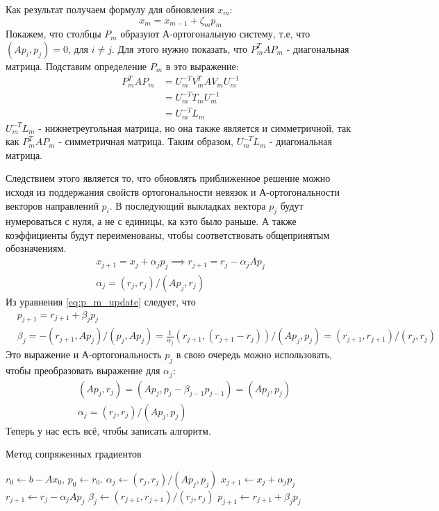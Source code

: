 Как результат получаем формулу для обновления $x_m$:
\begin{equation*}
    x_m = x_{m-1} + \zeta_m p_m
\end{equation*}
Покажем, что столбцы $P_m$ образуют А-ортогональную систему, т.е, что $(Ap_i,p_j) = 0$, для $i \neq j$.
Для этого нужно показать, что $P_m^T AP_m$ - диагональная матрица. Подставим определение $P_m$ в это выражение:
\begin{align}
    P_m^T AP_m &= U_m^{-T}V_m^T AV_m U_m^{-1} \\
               &= U_m^{-T}T_m U_m^{-1} \\
               &=U_m^{-T}L_m
\end{align}
$U_m^{-T}L_m$ - нижнетреугольная матрица, но она также является и симметричной, 
так как $P_m^T AP_m$ - симметричная матрица. Таким образом, $U_m^{-T}L_m$ - диагональная матрица.
\par Следствием этого является то, что обновлять приближенное решение можно исходя из
поддержания свойств ортогональности невязок и А-ортогональности векторов направлений $p_i$.
В последующий выкладках вектора $p_j$ будут нумероваться с нуля, а не с единицы, ка кэто было раньше.
А также коэффициенты будут переименованы, чтобы соответствовать общепринятым обозначениям.
\begin{align*}
    x_{j+1} = x_j + \alpha_j p_j \implies r_{j+1} = r_j - \alpha_j A p_j \\
    \alpha_j = \left( r_j, r_j \right) / \left( Ap_j, r_j \right)
\end{align*}
Из уравнения \eqref{eq:p_m_update} следует, что 
\begin{align*}
    &p_{j+1} = r_{j+1} + \beta_j p_j  \\
    &\beta_j = - (r_{j+1}, Ap_j) / (p_j, Ap_j) = \frac{1}{\alpha_j} (r_{j+1}, (r_{j+1}-r_j)) / (Ap_j,p_j) = (r_{j+1}, r_{j+1}) / (r_j,r_j)
\end{align*}
Это выражение и А-ортогональность $p_j$ в свою очередь можно использовать, чтобы преобразовать выражение для $\alpha_j$:
\begin{align*}
    &(Ap_j,r_j) = (Ap_j,p_j-\beta_{j-1}p_{j-1}) = (Ap_j,p_j) \\
    &\alpha_j = (r_j,r_j)/(Ap_j, p_j)
\end{align*}
Теперь у нас есть всё, чтобы записать алгоритм.
\begin{algorithm}
    \caption{Метод сопряженных градиентов}
    \begin{algorithmic}[1]
    \State $r_0 \gets b - A x_0$, $p_0 \gets r_0$.
        \State $\alpha_j \gets (r_j, r_j) / (A p_j, p_j)$
        \State $x_{j+1} \gets x_j + \alpha_j p_j$
        \State $r_{j+1} \gets r_j - \alpha_j A p_j$
        \State $\beta_j \gets (r_{j+1}, r_{j+1}) / (r_j, r_j)$
        \State $p_{j+1} \gets r_{j+1} + \beta_j p_j$
    \EndFor
    \end{algorithmic}
    \end{algorithm}

